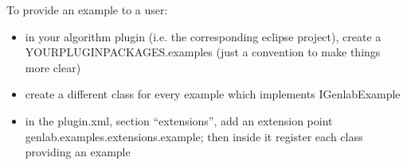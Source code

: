 \documentclass[a4paper,10pt]{book}
\begin{document}
To provide an example to a user:
\begin{itemize}
\item in your algorithm plugin (i.e. the corresponding eclipse project), create a YOURPLUGINPACKAGES.examples (just a convention to make things more clear)
\item create a different class for every example which implements IGenlabExample
\item in the plugin.xml, section ``extensions'', add an extension point genlab.examples.extensions.example; then inside it register each class providing an example
\end{itemize}

 
 
\end{document}
